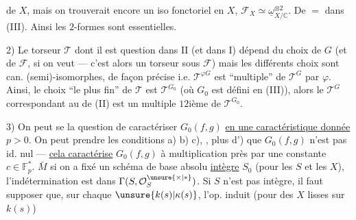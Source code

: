  de $X$, mais on trouverait encore
un iso fonctoriel en $X$, $\mathcal{F}_X\simeq\underline{\omega}_{X/\mathbb{C}}^{\otimes2}$.
De $=$ dans (III). Ainsi les $2$-formes sont essentielles.

2)  Le torseur $\mathcal{T}$ dont il est question dans
II (et  dans I) dépend du choix de
$G$ (et de $\mathcal{F}$, si on veut --- c'est alors un
torseur sous $\mathcal{F}$) mais les  différents choix
sont can. (semi)-isomorphes, de façon précise
i.e. $\mathcal{T}^{\varphi G}$ est ``multiple'' de $\mathcal{T}^{G}$ par $\varphi$.
Ainsi, le choix ``le plus fin'' de $\mathcal{T}$ est $\mathcal{T}^{G_0}$
(où $G_0$ est défini en (III)), alors le $\mathcal{T}^{G}$
correspondant au   de (II) est un
multiple $12$ième de $\mathcal{T}^{G_0}$.

3) On peut se  la question
de caractériser $G_0(f,g)$ \uline{en une caractéristique donnée} $p>0$.
On peut prendre les conditions
a) b) c), , plus d') que $G_0(f,g)$ n'est pas id. nul
--- \uline{cela caractérise} $G_0(f,g)$ à multiplication près
par une constante $c\in\mathbb{F}_p^{*}$.
$\bar{M}$  si
on a fixé un schéma de base absolu
\uline{intègre} $S_0$ (pour les $S$ et les $X$), l'indétermination
est dans $\Gamma(S,\mathcal{O}_S^{\unsure{\times|*}})$.
Si $S$ n'est pas intègre, il faut supposer que, sur chaque
$\unsure{k(s)|\kappa(s)}$, l'op. induit (pour des $X$ lisses
 sur $k(s)$)


